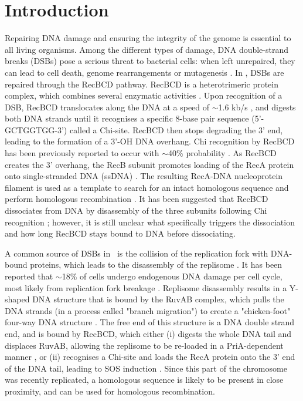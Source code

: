 \section*{Introduction}
Repairing DNA damage and ensuring the integrity of the genome is essential to all living organisms. Among the different types of damage, DNA double-strand breaks (DSBs) pose a serious threat to bacterial cells: when left unrepaired, they can lead to cell death, genome rearrangements or mutagenesis \cite{Wyman2006}. In \ecoli, DSBs are repaired through the RecBCD pathway. RecBCD is a heterotrimeric protein complex, which combines several enzymatic activities \cite{Dillingham2008}. Upon recognition of a DSB, RecBCD translocates along the DNA at a speed of $\sim$1.6 kb/s \cite{Wiktor2018}, and digests both DNA strands until it recognises a specific 8-base pair sequence (5'-GCTGGTGG-3') called a Chi-site. RecBCD then stops degrading the 3' end, leading to the formation of a 3'-OH DNA overhang. Chi recognition by RecBCD has been previously reported to occur with $\sim$40\% probability \cite{Taylor1992,Cockram2015}. As RecBCD creates the 3' overhang, the RecB subunit promotes loading of the RecA protein onto single-stranded DNA (ssDNA) \cite{Churchill2000, Spies2006}. The resulting RecA-DNA nucleoprotein filament is used as a template to search for an intact homologous sequence and perform homologous recombination \cite{Wyman2004,Wiktor2021}. It has been suggested that RecBCD dissociates from DNA by disassembly of the three subunits following Chi recognition \cite{Taylor1999}; however, it is still unclear what specifically triggers the dissociation and how long RecBCD stays bound to DNA before dissociating.

A common source of DSBs in \ecoli\ is the collision of the replication fork with DNA-bound proteins, which leads to the disassembly of the replisome \cite{Michel1997}. It has been reported that $\sim$18\% of cells undergo endogenous DNA damage per cell cycle, most likely from replication fork breakage \cite{Sinha2018}. Replisome disassembly results in a Y-shaped DNA structure that is bound by the RuvAB complex, which pulls the DNA strands (in a process called "branch migration") to create a "chicken-foot" four-way DNA structure \cite{Seigneur1998}. The free end of this structure is a DNA double strand end, and is bound by RecBCD, which either (i) digests the whole DNA tail and displaces RuvAB, allowing the replisome to be re-loaded in a PriA-dependent manner \cite{Seigneur1998}, or (ii) recognises a Chi-site and loads the RecA protein onto the 3' end of the DNA tail, leading to SOS induction \cite{Michel2001}. Since this part of the chromosome was recently replicated, a homologous sequence is likely to be present in close proximity, and can be used for homologous recombination.

